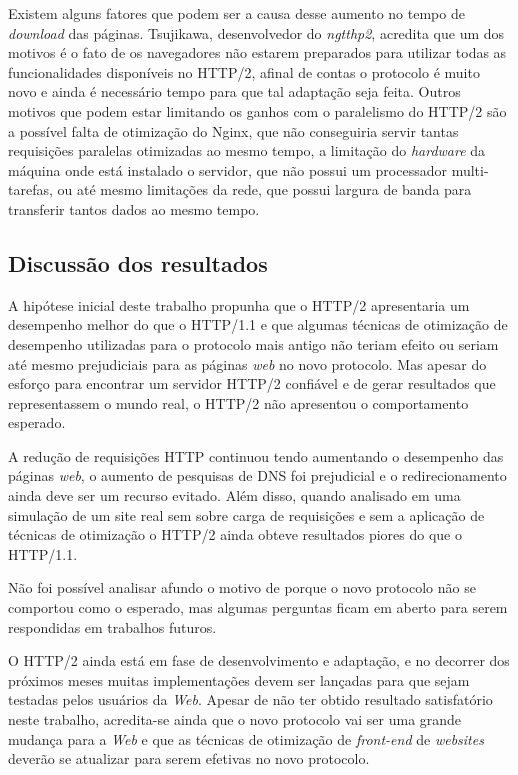 Existem alguns fatores que podem ser a causa desse aumento no tempo de \textit{download} das páginas. Tsujikawa, desenvolvedor do \textit{ngtthp2}, acredita que um dos motivos é o fato de os navegadores não estarem preparados para utilizar todas as funcionalidades disponíveis no HTTP/2, afinal de contas o protocolo é muito novo e ainda é necessário tempo para que tal adaptação seja feita. Outros motivos que podem estar limitando os ganhos com o paralelismo do HTTP/2 são a possível falta de otimização do Nginx, que não conseguiria servir tantas requisições paralelas otimizadas ao mesmo tempo, a limitação do \textit{hardware} da máquina onde está instalado o servidor, que não possui um processador multi-tarefas, ou até mesmo limitações da rede, que possui largura de banda para transferir tantos dados ao mesmo tempo.

\subsection{Discussão dos resultados}
\label{discussaodosresultados}

A hipótese inicial deste trabalho propunha que o HTTP/2 apresentaria um desempenho melhor do que o HTTP/1.1 e que algumas técnicas de otimização de desempenho utilizadas para o protocolo mais antigo não teriam efeito ou seriam até mesmo prejudiciais para as páginas \textit{web} no novo protocolo. Mas apesar do esforço para encontrar um servidor HTTP/2 confiável e de gerar resultados que representassem o mundo real, o HTTP/2 não apresentou o comportamento esperado.

A redução de requisições HTTP continuou tendo aumentando o desempenho das páginas \textit{web}, o aumento de pesquisas de DNS foi prejudicial e o redirecionamento ainda deve ser um recurso evitado. Além disso, quando analisado em uma simulação de um site real sem sobre carga de requisições e sem a aplicação de técnicas de otimização o HTTP/2 ainda obteve resultados piores do que o HTTP/1.1.

Não foi possível analisar afundo o motivo de porque o novo protocolo não se comportou como o esperado, mas algumas perguntas ficam em aberto para serem respondidas em trabalhos futuros.

O HTTP/2 ainda está em fase de desenvolvimento e adaptação, e no decorrer dos próximos meses muitas implementações devem ser lançadas para que sejam testadas pelos usuários da \textit{Web}. Apesar de não ter obtido resultado satisfatório neste trabalho, acredita-se ainda que o novo protocolo vai ser uma grande mudança para a \textit{Web} e que as técnicas de otimização de \textit{front-end} de \textit{websites} deverão se atualizar para serem efetivas no novo protocolo.

